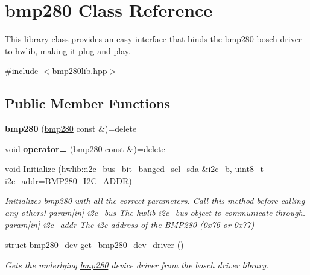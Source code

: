 \hypertarget{classbmp280}{}\section{bmp280 Class Reference}
\label{classbmp280}


This library class provides an easy interface that binds the \mbox{\hyperlink{classbmp280}{bmp280}} bosch driver to hwlib, making it \textquotesingle{}plug and play\textquotesingle{}.  




{\ttfamily \#include $<$bmp280lib.\+hpp$>$}

\subsection*{Public Member Functions}
\begin{DoxyCompactItemize}
\item 
\mbox{\label{classbmp280_a8894efbfc8fd5622ab7872b2546bec5e}} 
{\bfseries bmp280} (\mbox{\hyperlink{classbmp280}{bmp280}} const \&)=delete
\item 
\mbox{\label{classbmp280_a15f44f28857be544ca8628a65f113a5e}} 
void {\bfseries operator=} (\mbox{\hyperlink{classbmp280}{bmp280}} const \&)=delete
\item 
\mbox{\label{classbmp280_ae6908ebdc711f42e5f1c7981c85a728d}} 
void \mbox{\hyperlink{classbmp280_ae6908ebdc711f42e5f1c7981c85a728d}{Initialize}} (\mbox{\hyperlink{classhwlib_1_1i2c__bus__bit__banged__scl__sda}{hwlib\+::i2c\+\_\+bus\+\_\+bit\+\_\+banged\+\_\+scl\+\_\+sda}} \&i2c\+\_\+b, uint8\+\_\+t i2c\+\_\+addr=B\+M\+P280\+\_\+\+I2\+C\+\_\+\+A\+D\+DR)
\begin{DoxyCompactList}\small\item\em Initializes \mbox{\hyperlink{classbmp280}{bmp280}} with all the correct parameters. Call this method before calling any others! param\mbox{[}in\mbox{]} i2c\+\_\+bus The hwlib i2c\+\_\+bus object to communicate through. param\mbox{[}in\mbox{]} i2c\+\_\+addr The i2c address of the B\+M\+P280 (0x76 or 0x77) \end{DoxyCompactList}\item 
struct \mbox{\hyperlink{structbmp280__dev}{bmp280\+\_\+dev}} \mbox{\hyperlink{classbmp280_ac15f0e1c589daaf1778a0f1b86620efb}{get\+\_\+bmp280\+\_\+dev\+\_\+driver}} ()
\begin{DoxyCompactList}\small\item\em Gets the underlying \mbox{\hyperlink{classbmp280}{bmp280}} device driver from the bosch driver library. \end{DoxyCompactList}\item 

\end{DoxyCompactItemize}
